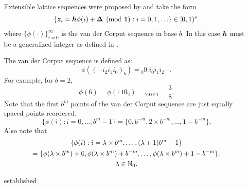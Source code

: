 \documentclass[authoryear]{elsarticle}
\newcommand{\appxintn}{\appxint_n}
\DeclareMathOperator{\appxint}{\hat{I}}
\begin{document}









Extensible lattice sequences were proposed by \cite{HicEtal00,Mai81a} and take the form
\begin{equation} \label{eq:extlat}
    \{\boldsymbol{z}_i = \boldsymbol{h}\phi(i)+ \boldsymbol{\Delta} \pmod{\boldsymbol{1}} : i=0,1, \ldots \} \in [0,1)^s.
\end{equation}
where $\{\phi(\cdot)\}_{i=0}^\infty$ is the van der Corput sequence in base $b$.  In this case $\boldsymbol{h}$ must be a generalized integer as defined in \cite[Section 2]{HicNie03a}.

The van der Corput sequence is defined as: 
\[
\phi((\cdots i_2 i_1 i_0)_b) = {}_b0.i_0 i_1 i_2 \cdots.
\]
For example, for $b=2$,
\[
\phi(6) = \phi(110_2) = {}_20.011 = \frac 38.
\]
Note that the first ${b^m}$ points of the van der Corput sequence are just equally spaced points reordered. 
\begin{equation} \label{eq:phipropone}
\{ \phi(i) : i = 0, \ldots, b^m-1 \} = \{0, b^{-m}, 2\times b^{-m}, \ldots, 1 - b^{-m} \}.
\end{equation}
Also note that
\begin{multline} \label{eq:phiproptwo}
\{ \phi(i) : i = \lambda \times b^m , \ldots, (\lambda+1)b^m-1 \} \\
= \{\phi(\lambda \times b^m) + 0, \phi(\lambda \times b^m) + b^{-m}, \ldots, \phi(\lambda \times b^m) + 1 - b^{-m} \} , \\
\lambda \in \mathbb{N}_{0}.
\end{multline}

\cite{HicEtal10a} established 




 
\end{document}
